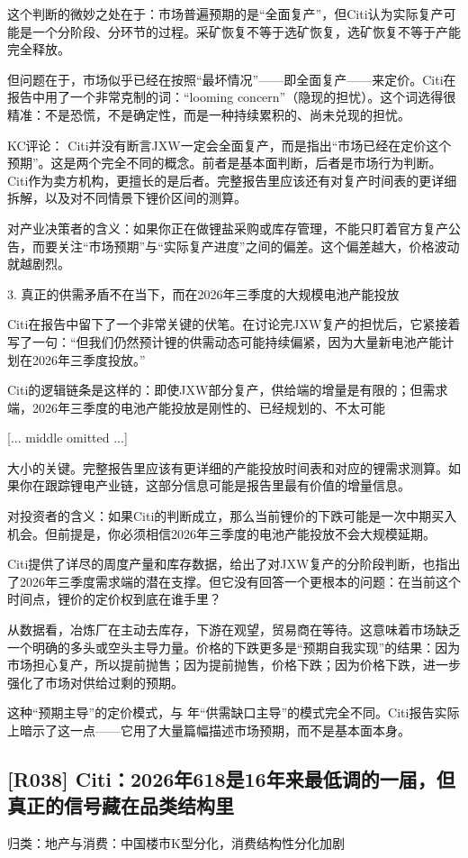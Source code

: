 \documentclass[11pt]{ctexart}
\begin{document}
这个判断的微妙之处在于：市场普遍预期的是“全面复产”，但Citi认为实际复产可能是一个分阶段、分环节的过程。采矿恢复不等于选矿恢复，选矿恢复不等于产能完全释放。

但问题在于，市场似乎已经在按照“最坏情况”——即全面复产——来定价。Citi在报告中用了一个非常克制的词：“looming concern”（隐现的担忧）。这个词选得很精准：不是恐慌，不是确定性，而是一种持续累积的、尚未兑现的担忧。

KC评论： Citi并没有断言JXW一定会全面复产，而是指出“市场已经在定价这个预期”。这是两个完全不同的概念。前者是基本面判断，后者是市场行为判断。Citi作为卖方机构，更擅长的是后者。完整报告里应该还有对复产时间表的更详细拆解，以及对不同情景下锂价区间的测算。

对产业决策者的含义：如果你正在做锂盐采购或库存管理，不能只盯着官方复产公告，而要关注“市场预期”与“实际复产进度”之间的偏差。这个偏差越大，价格波动就越剧烈。

3. 真正的供需矛盾不在当下，而在2026年三季度的大规模电池产能投放

Citi在报告中留下了一个非常关键的伏笔。在讨论完JXW复产的担忧后，它紧接着写了一句：“但我们仍然预计锂的供需动态可能持续偏紧，因为大量新电池产能计划在2026年三季度投放。”

Citi的逻辑链条是这样的：即使JXW部分复产，供给端的增量是有限的；但需求端，2026年三季度的电池产能投放是刚性的、已经规划的、不太可能

[... middle omitted ...]

大小的关键。完整报告里应该有更详细的产能投放时间表和对应的锂需求测算。如果你在跟踪锂电产业链，这部分信息可能是报告里最有价值的增量信息。

对投资者的含义：如果Citi的判断成立，那么当前锂价的下跌可能是一次中期买入机会。但前提是，你必须相信2026年三季度的电池产能投放不会大规模延期。

Citi提供了详尽的周度产量和库存数据，给出了对JXW复产的分阶段判断，也指出了2026年三季度需求端的潜在支撑。但它没有回答一个更根本的问题：在当前这个时间点，锂价的定价权到底在谁手里？

从数据看，冶炼厂在主动去库存，下游在观望，贸易商在等待。这意味着市场缺乏一个明确的多头或空头主导力量。价格的下跌更多是“预期自我实现”的结果：因为市场担心复产，所以提前抛售；因为提前抛售，价格下跌；因为价格下跌，进一步强化了市场对供给过剩的预期。

这种“预期主导”的定价模式，与 年“供需缺口主导”的模式完全不同。Citi报告实际上暗示了这一点——它用了大量篇幅描述市场预期，而不是基本面本身。

\subsection{[R038] Citi：2026年618是16年来最低调的一届，但真正的信号藏在品类结构里}
{\small\color{refgray}归类：地产与消费：中国楼市K型分化，消费结构性分化加剧}
\end{document}

